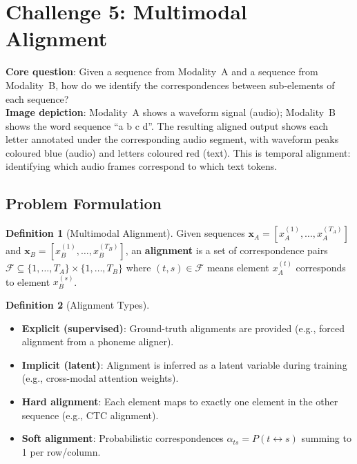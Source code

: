 \documentclass[12pt,a4paper]{article}
\theoremstyle{definition}
\newtheorem{definition}{Definition}[section]
\theoremstyle{plain}
\theoremstyle{remark}
\begin{document}
\newpage
\section{Challenge 5: Multimodal Alignment}
\label{sec:align}

\begin{tcolorbox}[challengebox,title={Challenge 5: Alignment}]
\textbf{Core question}: Given a sequence from Modality~A and a sequence from Modality~B, how do we identify the correspondences between sub-elements of each sequence?\\[4pt]
\textbf{Image depiction}: Modality~A shows a waveform signal (audio); Modality~B shows the word sequence ``a b c d''. The resulting aligned output shows each letter annotated under the corresponding audio segment, with waveform peaks coloured blue (audio) and letters coloured red (text). This is temporal alignment: identifying which audio frames correspond to which text tokens.
\end{tcolorbox}

\subsection{Problem Formulation}

\begin{definition}[Multimodal Alignment]
Given sequences $\mathbf{x}_A = [x_A^{(1)},\ldots,x_A^{(T_A)}]$ and $\mathbf{x}_B = [x_B^{(1)},\ldots,x_B^{(T_B)}]$, an \textbf{alignment} is a set of correspondence pairs $\mathcal{F} \subseteq \{1,\ldots,T_A\} \times \{1,\ldots,T_B\}$ where $(t, s) \in \mathcal{F}$ means element $x_A^{(t)}$ corresponds to element $x_B^{(s)}$.
\end{definition}

\begin{definition}[Alignment Types]
\begin{itemize}[nosep]
  \item \textbf{Explicit (supervised)}: Ground-truth alignments are provided (e.g., forced alignment from a phoneme aligner).
  \item \textbf{Implicit (latent)}: Alignment is inferred as a latent variable during training (e.g., cross-modal attention weights).
  \item \textbf{Hard alignment}: Each element maps to exactly one element in the other sequence (e.g., CTC alignment).
  \item \textbf{Soft alignment}: Probabilistic correspondences $\alpha_{ts} = P(t \leftrightarrow s)$ summing to 1 per row/column.
\end{itemize}
\end{definition}
\end{document}
